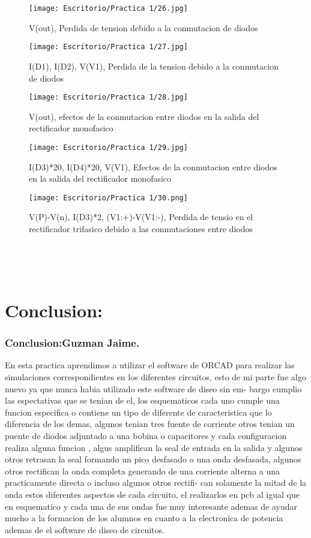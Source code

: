 \documentclass[11pt,a4paper]{article}
\begin{document}
\begin{figure}[hbtp]
\centering
\texttt{[image: Escritorio/Practica 1/26.jpg]}
\caption{V(out), Perdida de tension debido a la conmutacion de diodos}
\end{figure}

\begin{figure}[hbtp]
\centering
\texttt{[image: Escritorio/Practica 1/27.jpg]}
\caption{I(D1), I(D2), V(V1), Perdida de la tension debido a la conmutacion de diodos}
\end{figure}

\begin{figure}[hbtp]
\centering
\texttt{[image: Escritorio/Practica 1/28.jpg]}
\caption{V(out), efectos de la conmutacion entre diodos en la salida del rectificador monofasico}
\end{figure}

\begin{figure}[hbtp]
\centering
\texttt{[image: Escritorio/Practica 1/29.jpg]}
\caption{I(D3)*20, I(D4)*20, V(V1), Efectos de la conmutacion entre diodos en la salida del rectificador monofasico}
\end{figure}

\begin{figure}[hbtp]
\centering
\texttt{[image: Escritorio/Practica 1/30.png]}
\caption{V(P)-V(n), I(D3)*2, (V1:+)-V(V1:-), Perdida de tensio en el rectificador trifasico debido a las conmutaciones entre diodos}
\end{figure}
\

\
\section{Conclusion:}
\subsubsection{Conclusion:Guzman Jaime.}
En esta practica aprendimos a utilizar el software de ORCAD para realizar
las simulaciones correspondientes en los diferentes circuitos, esto de mi parte
fue algo nuevo ya que nunca habia utilizado este software de diseo sin em-
bargo cumplio las espectativas que se tenian de el, los esquematicos cada uno
cumple una funcion especifica o contiene un tipo de diferente de caracteristica
que lo diferencia de los demas, algunos tenian tres fuente de corriente otros
tenian un puente de diodos adjuntado a una bobina o capacitores y cada
configuracion realiza alguna funcion , algus amplifican la seal de entrada en
la salida y algunos otros retrasan la seal formando un pico desfasado o una
onda desfasada, algunos otros rectifican la onda completa generando de una
corriente alterna a una practicamente directa o incluso algunos otros rectifi-
can solamente la mitad de la onda estos diferentes aspectos de cada circuito,
el realizarlos en pcb al igual que en esquematico y cada una de sus ondas
fue muy interesante ademas de ayudar mucho a la formacion de los alumnos
en cuanto a la electronica de potencia ademas de el software de diseo de
circuitos.\\
\end{document}
